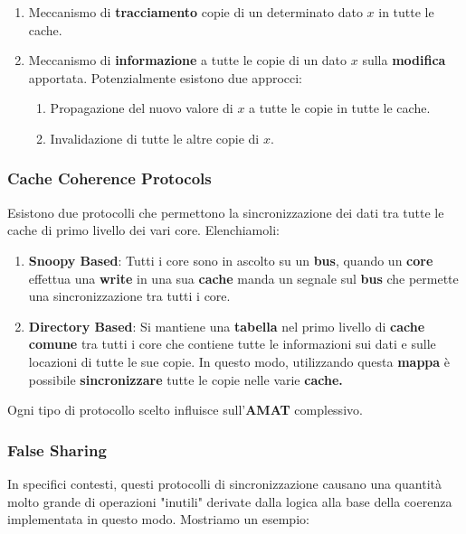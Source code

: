 \documentclass{article}
\begin{document}
\begin{enumerate}
    \item Meccanismo di \textbf{tracciamento} copie di un determinato dato $x$ in tutte le cache.
    \item Meccanismo di \textbf{informazione} a tutte le copie di un dato $x$ sulla \textbf{modifica} apportata. Potenzialmente esistono due approcci:
    \begin{enumerate}
        \item Propagazione del nuovo valore di $x$ a tutte le copie in tutte le cache.
        \item Invalidazione di tutte le altre copie di $x$.
    \end{enumerate}
\end{enumerate}

\subsubsection{Cache Coherence Protocols}

Esistono due protocolli che permettono la sincronizzazione dei dati tra tutte le cache di primo livello dei vari core. Elenchiamoli:

\begin{enumerate}
    \item \textbf{Snoopy Based}: Tutti i core sono in ascolto su un \textbf{bus}, quando un \textbf{core} effettua una \textbf{write} in una sua \textbf{cache} manda un segnale sul \textbf{bus} che permette una sincronizzazione tra tutti i core.
    \item \textbf{Directory Based}: Si mantiene una \textbf{tabella} nel primo livello di \textbf{cache comune} tra tutti i core che contiene tutte le informazioni sui dati e sulle locazioni di tutte le sue copie. In questo modo, utilizzando questa \textbf{mappa} è possibile \textbf{sincronizzare} tutte le copie nelle varie \textbf{cache.}
\end{enumerate}

Ogni tipo di protocollo scelto influisce sull'\textbf{AMAT} complessivo.

\subsubsection{False Sharing}

In specifici contesti, questi protocolli di sincronizzazione causano una quantità molto grande di operazioni "inutili" derivate dalla logica alla base della coerenza implementata in questo modo. Mostriamo un esempio:
\end{document}
